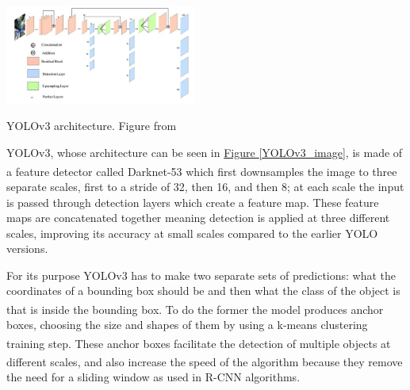 \documentclass[11pt]{article}		%
\newcommand{\supercite}[1]{\textsuperscript{\cite{#1}}}		%
\newcommand{\figref}[1]{\hyperref[#1]{Figure \ref*{#1}}}    %
\begin{document}
	        \begin{floatingfigure}[r]{0.5\textwidth}
				\centering
			    \includegraphics[width=0.47\textwidth]{Network-architecture-of-YOLOv3_W640.jpg}
			    \caption{YOLOv3 architecture. Figure from \cite{YOLOv3_image}}
			    \label{YOLOv3_image}
			\end{floatingfigure}
            \hspace*{2ex}YOLOv3, whose architecture can be seen in \figref{YOLOv3_image}, is made of a feature detector called Darknet-53\supercite{YOLOV3} which first downsamples the image to three separate scales, first to a stride of 32, then 16, and then 8; at each scale the input is passed through detection layers which create a feature map. These feature maps are concatenated together meaning detection is applied at three different scales, improving its accuracy at small scales compared to the earlier YOLO versions.
			\begin{floatingfigure}[r]{0pt} \end{floatingfigure}
			\hspace*{2ex}For its purpose YOLOv3 has to make two separate sets of predictions: what the coordinates of a bounding box should be and then what the class of the object is that is inside the bounding box\supercite{Anchor_Boxes}. To do the former the model produces anchor boxes, choosing the size and shapes of them by using a k-means clustering training step\supercite{k-means-clustering}. These anchor boxes facilitate the detection of multiple objects at different scales\supercite{YOLOV2}, and also increase the speed of the algorithm because they remove the need for a sliding window as used in R-CNN algorithms.
\end{document}
